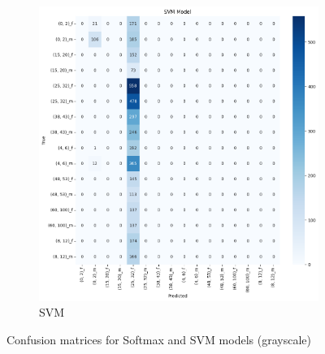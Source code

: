 \documentclass{article}
\begin{document}
\begin{figure}[H]
\begin{subfigure}[b]{0.48\textwidth}
        \includegraphics[width=\textwidth]{assets/confusion_matrix/grayscale/SVM Model.png}
        \caption{SVM}
    \end{subfigure}
    \caption{Confusion matrices for Softmax and SVM models (grayscale)}
    \label{fig:grayscale_confusion_matrices_1}
\end{figure}
\end{document}
